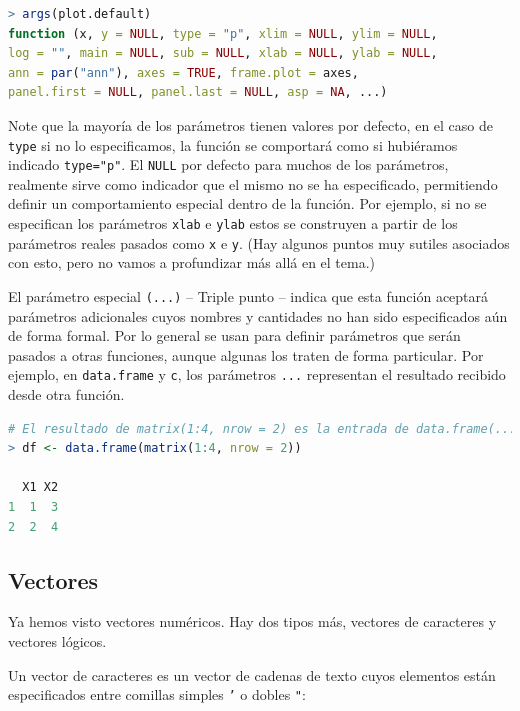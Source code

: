 \begin{lstlisting}[language=R]
> args(plot.default)
function (x, y = NULL, type = "p", xlim = NULL, ylim = NULL,
log = "", main = NULL, sub = NULL, xlab = NULL, ylab = NULL,
ann = par("ann"), axes = TRUE, frame.plot = axes,
panel.first = NULL, panel.last = NULL, asp = NA, ...)
\end{lstlisting}

Note que la mayoría de los parámetros tienen valores por defecto, en el caso de
\texttt{type} si no lo especificamos, la función se comportará como si
hubiéramos indicado \texttt{type="p"}. El \texttt{NULL} por defecto para muchos
de los parámetros, realmente sirve como indicador que el mismo no se ha
especificado, permitiendo definir un comportamiento especial dentro de la
función. Por ejemplo, si no se especifican los parámetros \texttt{xlab} e
\texttt{ylab} estos se construyen a partir de los parámetros reales pasados
como \texttt{x} e \texttt{y}. (Hay algunos puntos muy sutiles asociados con
esto, pero no vamos a profundizar más allá en el tema.)

El parámetro especial \texttt{(...)} -- Triple punto -- indica que esta función
aceptará parámetros adicionales cuyos nombres y cantidades no han sido
especificados aún de forma formal. Por lo general se usan para definir
parámetros que serán pasados a otras funciones, aunque algunas los traten de
forma particular.  Por ejemplo, en \texttt{data.frame} y \texttt{c}, los
parámetros \texttt{...} representan el resultado recibido desde otra función.

\begin{lstlisting}[language=R]
# El resultado de matrix(1:4, nrow = 2) es la entrada de data.frame(...)
> df <- data.frame(matrix(1:4, nrow = 2))

  X1 X2
1  1  3
2  2  4
\end{lstlisting}

\subsection{Vectores} \label{vectores}

Ya hemos visto vectores numéricos. Hay dos tipos más, vectores de caracteres y
vectores lógicos.

Un vector de caracteres es un vector de cadenas de texto cuyos elementos están
especificados entre comillas simples \texttt{'} o dobles \texttt{"}:

